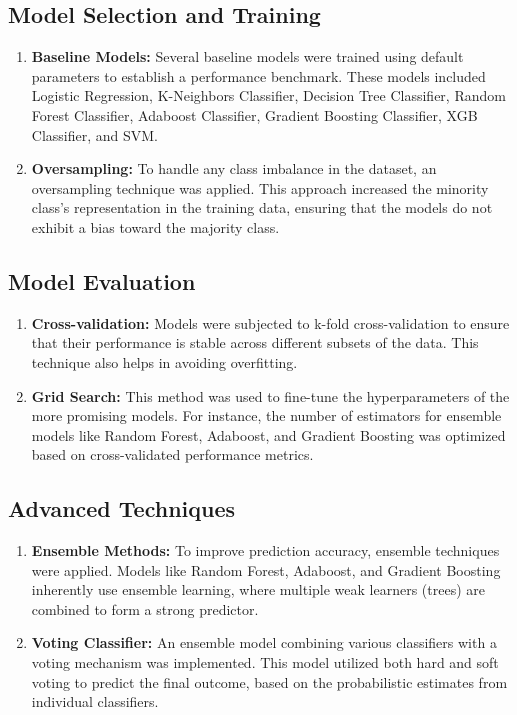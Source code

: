 \documentclass[a4paper,num-refs,gigabyte]{oup-contemporary}
\begin{document}
\subsection{Model Selection and Training}
\begin{enumerate}
    \item \textbf{Baseline Models:} Several baseline models were trained using default parameters to establish a performance benchmark. These models included Logistic Regression, K-Neighbors Classifier, Decision Tree Classifier, Random Forest Classifier, Adaboost Classifier, Gradient Boosting Classifier, XGB Classifier, and SVM.
    \item \textbf{Oversampling:} To handle any class imbalance in the dataset, an oversampling technique was applied. This approach increased the minority class's representation in the training data, ensuring that the models do not exhibit a bias toward the majority class.
\end{enumerate}

\subsection{Model Evaluation}
\begin{enumerate}
    \item \textbf{Cross-validation:} Models were subjected to k-fold cross-validation to ensure that their performance is stable across different subsets of the data. This technique also helps in avoiding overfitting.
    \item \textbf{Grid Search:} This method was used to fine-tune the hyperparameters of the more promising models. For instance, the number of estimators for ensemble models like Random Forest, Adaboost, and Gradient Boosting was optimized based on cross-validated performance metrics.
\end{enumerate}

\subsection{Advanced Techniques}
\begin{enumerate}
    \item \textbf{Ensemble Methods:} To improve prediction accuracy, ensemble techniques were applied. Models like Random Forest, Adaboost, and Gradient Boosting inherently use ensemble learning, where multiple weak learners (trees) are combined to form a strong predictor.
    \item \textbf{Voting Classifier:} An ensemble model combining various classifiers with a voting mechanism was implemented. This model utilized both hard and soft voting to predict the final outcome, based on the probabilistic estimates from individual classifiers.
\end{enumerate}
\end{document}
